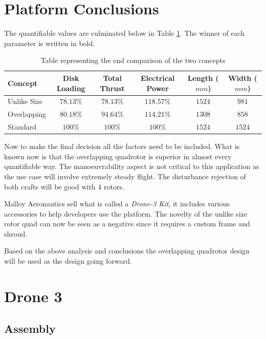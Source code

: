 \section{Platform Conclusions}

The quantifiable values are culminated below in Table \ref{TAB_ConceptComparison}. The winner of each parameter is written in bold.

\begin{table}[H]
	\centering
	\begin{tabular}{l | c | c | c | c | c }
		Concept & Disk Loading & Total Thrust & Electrical Power & Length ($mm$)& Width ($mm$) \\
		\hline\hline
		Unlike Size	  & \boldmath$78.13\%$  & $78.13\%$ 	& $118.57\%$	& $1524$ & $981$ \\
		Overlapping    & $80.18\%$ & \boldmath$94.64\%$  & \boldmath$114.21\%$	& \boldmath$1308$ & \boldmath$858$ \\
		\hline\hline
		Standard		& $100\%$ 	& $100\%$  	  & $100\%$			& $1524$ & $1524$\\
	\end{tabular}
	\label{TAB_ConceptComparison}
	\caption{Table representing the end comparison of the two concepts}
\end{table}

Now to make the final decision all the factors need to be included. What is known now is that the overlapping quadrotor is superior in almost every quantifiable way. The manoeuvrability aspect is not critical to this application as the use case will involve extremely steady flight. The disturbance rejection of both crafts will be good with 4 rotors. 

Malloy Aeronautics sell what is called a \textit{Drone-3 Kit}, it includes various accessories to help developers use the platform. The novelty of the unlike size rotor quad can now be seen as a negative since it requires a custom frame and shroud.

Based on the above analysis and conclusions the overlapping quadrotor design will be used as the design going forward.

\section{Drone 3}
\subsection{Assembly}




